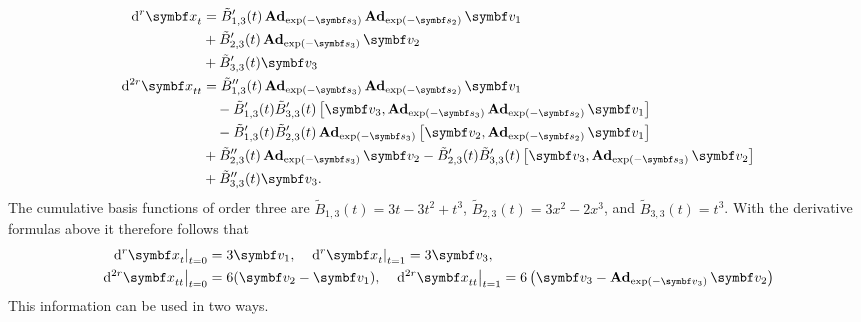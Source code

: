 \begin{equation}
  \begin{aligned}
    \mathrm{d}^{r }\x_{t}  & = \tilde B_{1, 3}'(t) \bAd_{\exp (-\symbf s_{3})} \bAd_{\exp(-\symbf s_{2})} \symbf v_{1}                                                                                         \\
                           & + \tilde B_{2, 3}'(t) \bAd_{\exp (-\symbf s_{3})} \symbf v_{2}                                                                                                                    \\
                           & + \tilde B_{3, 3}'(t) \symbf v_{3}                                                                                                                                                \\
    \mathrm{d}^{2r}\x_{tt} & = \tilde B_{1, 3}''(t) \bAd_{\exp (-\symbf s_{3})} \bAd_{\exp(-\symbf s_{2})} \symbf v_{1}                                                                                        \\
                           & \quad - \tilde B_{1,3}'(t) \tilde B_{3, 3}'(t) \left[ \symbf v_{3}, \bAd_{\exp(-\symbf s_{3})} \bAd_{\exp(-\symbf s_{2})} \symbf v_{1} \right]                                    \\
                           & \quad - \tilde B_{1,3}'(t) \tilde B_{2, 3}'(t) \bAd_{\exp(-\symbf s_{3})} \left[ \symbf v_{2}, \bAd_{\exp(-\symbf s_{2})} \symbf v_{1} \right ]                                   \\
                           & + \tilde B_{2, 3}''(t) \bAd_{\exp (-\symbf s_{3})} \symbf v_{2} - \tilde B_{2, 3}'(t) \tilde B'_{3, 3}(t) \left[ \symbf v_{3} , \bAd_{\exp(- \symbf s_{3})} \symbf v_{2} \right ] \\
                           & + \tilde B_{3, 3}''(t) \symbf v_{3}.
  \end{aligned}
\end{equation}
The cumulative basis functions of order three are $\tilde B_{1, 3}(t) = 3t - 3 t^{2} + t^{3}$, $\tilde B_{2, 3}(t) = 3x^{2} - 2 x^{3}$, and $\tilde B_{3, 3}(t) = t^{3}$. With the derivative formulas above it therefore follows that
\begin{equation}
  \begin{aligned}
    \left. \mathrm{d}^{r} \x_{t} \right|_{t = 0}   & = 3 \symbf v_{1}, \quad \left. \mathrm{d}^{r} \x_{t} \right|_{t = 1} = 3 \symbf v_{3},                                                                            \\
    \left. \mathrm{d}^{2r} \x_{tt} \right|_{t = 0} & = 6 (\symbf v_{2} - \symbf v_{1}), \quad \left. \mathrm{d}^{2r} \x_{tt} \right|_{t = 1} = 6 \left(\symbf v_{3} - \bAd_{\exp(-\symbf v_{3})} \symbf v_{2} \right)
  \end{aligned}
\end{equation}
This information can be used in two ways.

